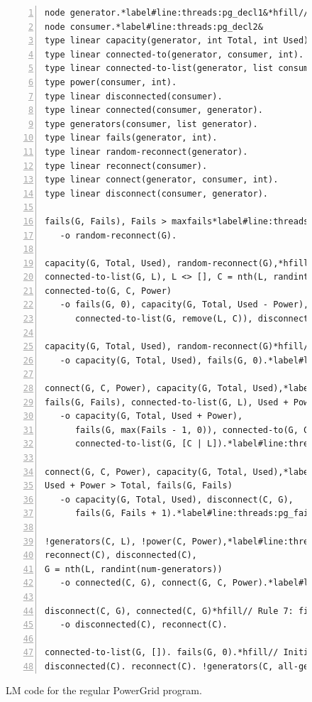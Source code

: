 \begin{figure}[h!]
\begin{Verbatim}[numbers=left,fontsize=\codesize,commandchars=*\#\&]
node generator.*label#line:threads:pg_decl1&*hfill// Type declaration
node consumer.*label#line:threads:pg_decl2&
type linear capacity(generator, int Total, int Used).*hfill// Predicate declaration
type linear connected-to(generator, consumer, int).
type linear connected-to-list(generator, list consumer).
type power(consumer, int).
type linear disconnected(consumer).
type linear connected(consumer, generator).
type generators(consumer, list generator).
type linear fails(generator, int).
type linear random-reconnect(generator).
type linear reconnect(consumer).
type linear connect(generator, consumer, int).
type linear disconnect(consumer, generator).

fails(G, Fails), Fails > maxfails*label#line:threads:pg_recon1&*hfill// Rule 1: disconnect one consumer
   -o random-reconnect(G).

capacity(G, Total, Used), random-reconnect(G),*hfill// Rule 2: disconnect one consumer
connected-to-list(G, L), L <> [], C = nth(L, randint(length(L))),
connected-to(G, C, Power)
   -o fails(G, 0), capacity(G, Total, Used - Power),
      connected-to-list(G, remove(L, C)), disconnect(C, G).

capacity(G, Total, Used), random-reconnect(G)*hfill// Rule 3: unable to disconnect one consumer
   -o capacity(G, Total, Used), fails(G, 0).*label#line:threads:pg_recon2&

connect(G, C, Power), capacity(G, Total, Used),*label#line:threads:pg_gen1&*hfill// Rule 4: connect consumer
fails(G, Fails), connected-to-list(G, L), Used + Power <= Total
   -o capacity(G, Total, Used + Power),
      fails(G, max(Fails - 1, 0)), connected-to(G, C, Power),
      connected-to-list(G, [C | L]).*label#line:threads:pg_gen2&

connect(G, C, Power), capacity(G, Total, Used),*label#line:threads:pg_fail1&*hfill// Rule 5: unable to connect consumer
Used + Power > Total, fails(G, Fails)
   -o capacity(G, Total, Used), disconnect(C, G),
      fails(G, Fails + 1).*label#line:threads:pg_fail2&

!generators(C, L), !power(C, Power),*label#line:threads:pg_connect1&*hfill// Rule 6: connect to a generator
reconnect(C), disconnected(C),
G = nth(L, randint(num-generators))
   -o connected(C, G), connect(G, C, Power).*label#line:threads:pg_connect2&

disconnect(C, G), connected(C, G)*hfill// Rule 7: finish disconnection
   -o disconnected(C), reconnect(C).

connected-to-list(G, []). fails(G, 0).*hfill// Initial facts
disconnected(C). reconnect(C). !generators(C, all-generators).
\end{Verbatim}
\caption{LM code for the regular PowerGrid program.}
\label{code:threads:powergrid}
\end{figure}

